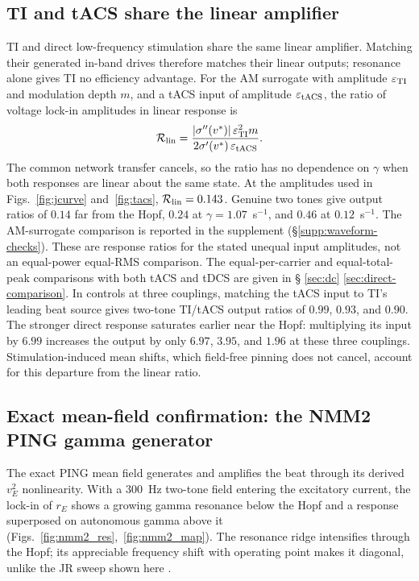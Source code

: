 \documentclass[11pt,a4paper]{article}
\newcommand{\Sig}{\sigma}
\providecommand{\DIFaddtex}[1]{{\protect\color{blue} \sf #1}} %
\providecommand{\DIFdeltex}[1]{{\protect\color{red} \scriptsize #1}} %
\providecommand{\DIFaddbegin}{} %
\providecommand{\DIFaddend}{} %
\providecommand{\DIFdelbegin}{} %
\providecommand{\DIFdelend}{} %
\providecommand{\DIFadd}[1]{\texorpdfstring{\DIFaddtex{#1}}{#1}} %
\providecommand{\DIFdel}[1]{\texorpdfstring{\DIFdeltex{#1}}{}} %
\begin{document}
\subsection{TI and tACS share the linear amplifier}\label{sec:tacs-results}
TI and direct low-frequency stimulation share the same linear amplifier.
Matching their generated in-band drives therefore matches their linear outputs;
resonance alone gives TI no efficiency advantage.
For the AM surrogate with amplitude $\varepsilon_{\rm TI}$ and modulation depth
$m$, and a tACS input of amplitude $\varepsilon_{\rm tACS}$, the ratio of voltage
lock-in amplitudes in linear response is
\[
\mathcal R_{\rm lin}
=\frac{|\Sig''(v^*)|\,\varepsilon_{\rm TI}^2m}{2\Sig'(v^*)\,\varepsilon_{\rm tACS}}.
\]
The common network transfer cancels, so the ratio has no dependence on $\gamma$
when both responses are linear about the same state. At the amplitudes used in
Figs.~\ref{fig:jcurve} and~\ref{fig:tacs}, $\mathcal R_{\rm lin}=0.143$.
Genuine two tones give output ratios of $0.14$ far from the Hopf, $0.24$ at
$\gamma=1.07$~s$^{-1}$, and $0.46$ at $0.12$~s$^{-1}$. The AM-surrogate
comparison is reported in the supplement (\S\ref{supp:waveform-checks}).
These are response ratios for the stated unequal input amplitudes, not an
\DIFdelbegin \DIFdel{equal-power }\DIFdelend \DIFaddbegin \DIFadd{equal-RMS }\DIFaddend comparison. The equal-per-carrier and equal-total-peak comparisons
with both tACS and tDCS are given in \S\DIFdelbegin \DIFdel{\ref{sec:dc}}\DIFdelend \DIFaddbegin \DIFadd{\ref{sec:direct-comparison}}\DIFaddend .
In controls at three couplings, matching the tACS input
to TI's leading beat source gives two-tone TI/tACS output ratios of $0.99$,
$0.93$, and $0.90$.
The stronger direct response saturates earlier near the Hopf: multiplying
its input by $6.99$ increases the output by only $6.97$, $3.95$, and $1.96$
at these three couplings. Stimulation-induced mean shifts, which field-free
pinning does not cancel, account for this departure from the linear ratio.

\subsection{Exact mean-field confirmation: the NMM2 PING gamma generator}\label{sec:nmm2-results}
The exact PING mean field generates and amplifies the beat through its derived
$v_E^2$ nonlinearity. With a $300$~Hz two-tone field entering the excitatory
current, the lock-in of $r_E$ shows a growing gamma resonance below the Hopf
and a response superposed on autonomous gamma above it
(Figs.~\ref{fig:nmm2_res},~\ref{fig:nmm2_map}). The resonance ridge intensifies
through the Hopf; its appreciable frequency shift with operating point makes
it diagonal, unlike the JR sweep shown here \cite{clusella2023}.
\end{document}
